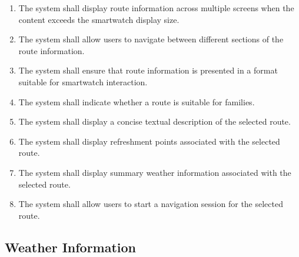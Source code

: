 \begin{enumerate}[label=\textbf{FR\arabic*}, ref=FR\arabic*, resume]

\item \label{fr-watch:fr12}
The system shall display route information across multiple screens when the content exceeds the smartwatch display size.

\item \label{fr-watch:fr13}
The system shall allow users to navigate between different sections of the route information.

\item \label{fr-watch:fr14}
The system shall ensure that route information is presented in a format suitable for smartwatch interaction.

\item \label{fr-watch:fr15}
The system shall indicate whether a route is suitable for families.

\item \label{fr-watch:fr16}
The system shall display a concise textual description of the selected route.

\item \label{fr-watch:fr17}
The system shall display refreshment points associated with the selected route.

\item \label{fr-watch:fr18}
The system shall display summary weather information associated with the selected route.

\item \label{fr-watch:fr19}
The system shall allow users to start a navigation session for the selected route.


\end{enumerate}


\subsection{Weather Information}

